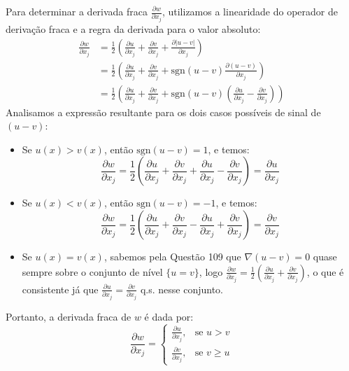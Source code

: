 \documentclass[cs_edp_2026.1.tex]{subfiles} %
\begin{document}
{	Para determinar a derivada fraca $\frac{\partial w}{\partial x_j}$, utilizamos a linearidade do operador de derivação fraca e a regra da derivada para o valor absoluto:
	\begin{align*}
		\frac{\partial w}{\partial x_j} &= \frac{1}{2} \left( \frac{\partial u}{\partial x_j} + \frac{\partial v}{\partial x_j} + \frac{\partial |u - v|}{\partial x_j} \right) \\
		&= \frac{1}{2} \left( \frac{\partial u}{\partial x_j} + \frac{\partial v}{\partial x_j} + \text{sgn}(u - v) \frac{\partial (u - v)}{\partial x_j} \right) \\
		&= \frac{1}{2} \left( \frac{\partial u}{\partial x_j} + \frac{\partial v}{\partial x_j} + \text{sgn}(u - v) \left( \frac{\partial u}{\partial x_j} - \frac{\partial v}{\partial x_j} \right) \right)
	\end{align*}
	Analisamos a expressão resultante para os dois casos possíveis de sinal de $(u - v)$:
	\begin{itemize}
		\item Se $u(x) > v(x)$, então $\text{sgn}(u - v) = 1$, e temos:
		$$\frac{\partial w}{\partial x_j} = \frac{1}{2} \left( \frac{\partial u}{\partial x_j} + \frac{\partial v}{\partial x_j} + \frac{\partial u}{\partial x_j} - \frac{\partial v}{\partial x_j} \right) = \frac{\partial u}{\partial x_j}$$
		\item Se $u(x) < v(x)$, então $\text{sgn}(u - v) = -1$, e temos:
		$$\frac{\partial w}{\partial x_j} = \frac{1}{2} \left( \frac{\partial u}{\partial x_j} + \frac{\partial v}{\partial x_j} - \frac{\partial u}{\partial x_j} + \frac{\partial v}{\partial x_j} \right) = \frac{\partial v}{\partial x_j}$$
		\item Se $u(x) = v(x)$, sabemos pela Questão 109 que $\nabla(u - v) = 0$ quase sempre sobre o conjunto de nível $\{u = v\}$, logo $\frac{\partial w}{\partial x_j} = \frac{1}{2}(\frac{\partial u}{\partial x_j} + \frac{\partial v}{\partial x_j})$, o que é consistente já que $\frac{\partial u}{\partial x_j} = \frac{\partial v}{\partial x_j}$ q.s. nesse conjunto.
	\end{itemize}
	Portanto, a derivada fraca de $w$ é dada por:
	$$\boxed{\frac{\partial w}{\partial x_j} = \begin{cases} \frac{\partial u}{\partial x_j}, & \text{se } u > v \\ \frac{\partial v}{\partial x_j}, & \text{se } v \ge u \end{cases}}$$
}

\end{document}

